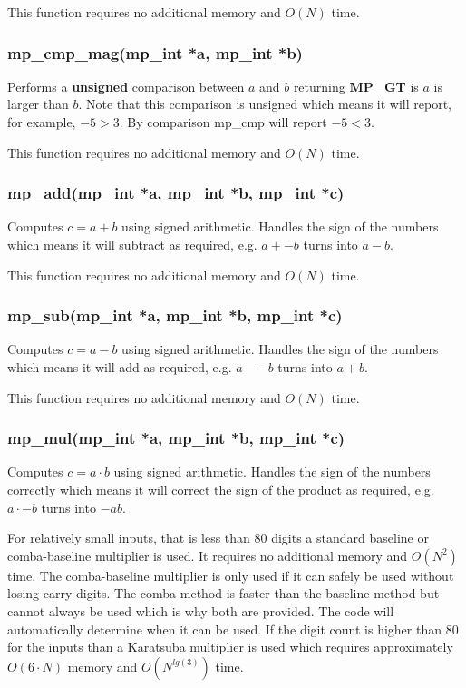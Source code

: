 \documentclass{article}
\begin{document}
This function requires no additional memory and $O(N)$ time.

\subsubsection{mp\_cmp\_mag(mp\_int *a, mp\_int *b)}
Performs a \textbf{unsigned} comparison between $a$ and $b$ returning \textbf{MP\_GT} is $a$ is larger than $b$.  Note 
that this comparison is unsigned which means it will report, for example, $-5 > 3$.  By comparison mp\_cmp will 
report $-5 < 3$.

This function requires no additional memory and $O(N)$ time.

\subsubsection{mp\_add(mp\_int *a, mp\_int *b, mp\_int *c)}
Computes $c = a + b$ using signed arithmetic.  Handles the sign of the numbers which means it will subtract as 
required, e.g. $a + -b$ turns into $a - b$.

This function requires no additional memory and $O(N)$ time.

\subsubsection{mp\_sub(mp\_int *a, mp\_int *b, mp\_int *c)}
Computes $c = a - b$ using signed arithmetic.   Handles the sign of the numbers which means it will add as 
required, e.g. $a - -b$ turns into $a + b$.

This function requires no additional memory and $O(N)$ time.

\subsubsection{mp\_mul(mp\_int *a, mp\_int *b, mp\_int *c)}
Computes $c = a \cdot b$ using signed arithmetic.  Handles the sign of the numbers correctly which means it will 
correct the sign of the product as required, e.g. $a \cdot -b$ turns into $-ab$.

For relatively small inputs, that is less than 80 digits a standard baseline or comba-baseline multiplier is used.  It
requires no additional memory and $O(N^2)$ time.  The comba-baseline multiplier is only used if it can safely be used
without losing carry digits.  The comba method is faster than the baseline method but cannot always be used which is why
both are provided.  The code will automatically determine when it can be used.  If the digit count is higher
than 80 for the inputs than a Karatsuba multiplier is used which requires approximately $O(6 \cdot N)$ memory and 
$O(N^{lg(3)})$ time.  
\end{document}
